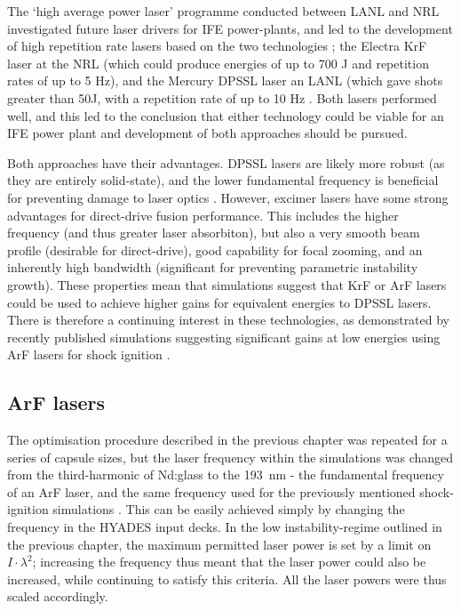 The `high average power laser' programme conducted between LANL and NRL investigated future laser drivers for IFE power-plants, and led to the development of high repetition rate lasers based on the two technologies \cite{Craxton2015}; the Electra KrF laser at the NRL (which could produce energies of up to 700 J and repetition rates of up to 5 Hz), and the Mercury DPSSL laser an LANL (which gave shots greater than 50J, with a repetition rate of up to 10 Hz \cite{Sethian2010}. Both lasers performed well, and this led to the conclusion that either technology could be viable for an IFE power plant and development of both approaches should be pursued.

Both approaches have their advantages. DPSSL lasers are likely more robust (as they are entirely solid-state), and the lower fundamental frequency is beneficial for preventing damage to laser optics \cite{Sethian2010}. However, excimer lasers have some strong advantages for direct-drive fusion performance. This includes the higher frequency (and thus greater laser absorbiton), but also a very smooth beam profile (desirable for direct-drive), good capability for focal zooming, and an inherently high bandwidth (significant for preventing parametric instability growth). These properties mean that simulations suggest that KrF or ArF lasers could be used to achieve higher gains for equivalent energies to DPSSL lasers. There is therefore a continuing interest in these technologies, as demonstrated by recently published simulations suggesting significant gains at low energies using ArF lasers for shock ignition \cite{Obenschain2020}.

\subsection{ArF lasers}

The optimisation procedure described in the previous chapter was repeated for a series of capsule sizes, but the laser frequency within the simulations was changed from the third-harmonic of Nd:glass to the 193~nm - the fundamental frequency of an ArF laser, and the same frequency used for the previously mentioned shock-ignition simulations \cite{Obenschain2020}. This can be easily achieved simply by changing the frequency in the HYADES input decks. In the low instability-regime outlined in the previous chapter, the maximum permitted laser power is set by a limit on $I \cdot \lambda^2$; increasing the frequency thus meant that the laser power could also be increased, while continuing to satisfy this criteria. All the laser powers were thus scaled accordingly. 

